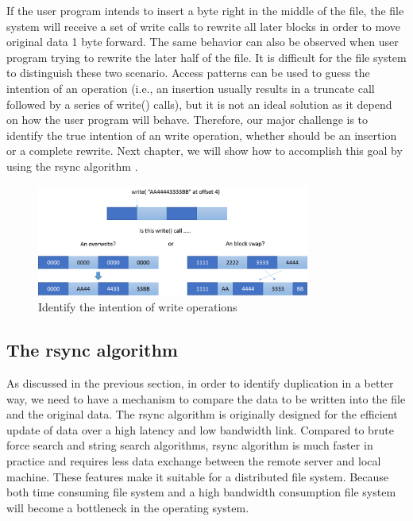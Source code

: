     If the user program intends to insert a byte right in the middle of the file, the file system will receive a set of write calls to rewrite all later blocks in order to move original data 1 byte forward. The same behavior can also be observed when user program trying to rewrite the later half of the file. It is difficult for the file system to distinguish these two scenario. Access patterns can be used to guess the intention of an operation (i.e., an insertion usually results in a truncate call followed by a series of write() calls), but it is not an ideal solution as it depend on how the user program will behave. Therefore, our major challenge is to identify the true intention of an write operation, whether should be an insertion or a complete rewrite. Next chapter, we will show how to accomplish this goal by using the rsync algorithm \cite{rsync_alg}.

\begin{figure}[t]
\centering
\includegraphics[width=0.8\textwidth]{Chapter-4/figs/fig6.png}
\caption{Identify the intention of write operations}
\label{fig:write_intention}
\end{figure}

\subsection{The rsync algorithm}

    As discussed in the previous section, in order to identify duplication in a better way, we need to have a mechanism to compare the data to be written into the file and the original data. The rsync algorithm is originally designed for the efficient update of data over a high latency and low bandwidth link. Compared to brute force search and string search algorithms, rsync algorithm is much faster in practice and requires less data exchange between the remote server and local machine. These features make it suitable for a distributed file system. Because both time consuming file system and a high bandwidth consumption file system will become a bottleneck in the operating system.

